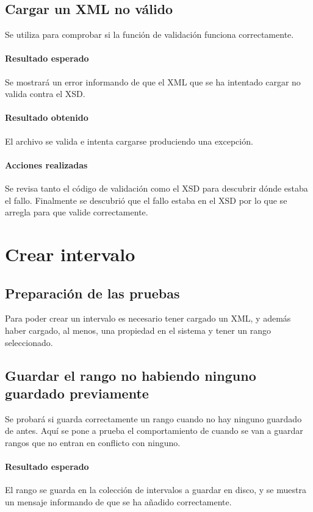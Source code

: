 \subsection{Cargar un XML no v\'alido}
Se utiliza para comprobar si la funci\'on de validaci\'on funciona correctamente.

\paragraph{Resultado esperado}
Se mostrar\'a un error informando de que el XML que se ha intentado cargar
no valida contra el XSD.

\paragraph{Resultado obtenido}
El archivo se valida e intenta cargarse produciendo una
excepci\'on.

\paragraph{Acciones realizadas}
Se revisa tanto el c\'odigo de validaci\'on como el XSD para descubrir
d\'onde estaba el fallo. Finalmente se descubri\'o que el fallo estaba en el
XSD por lo que se arregla para que valide correctamente.

\section{Crear intervalo}
\subsection{Preparaci\'on de las pruebas}
Para poder crear un intervalo es necesario tener cargado un XML, y adem\'as haber cargado,
al menos, una propiedad en el sistema y tener un rango seleccionado.

\subsection{Guardar el rango no habiendo ninguno guardado previamente}
Se probar\'a si guarda correctamente un rango cuando no hay ninguno guardado de antes.
Aqu\'i se pone a prueba el comportamiento de cuando se van a guardar rangos que no entran
en conflicto con ninguno.

\paragraph{Resultado esperado}
El rango se guarda en la colecci\'on de intervalos a guardar en disco, y se 
muestra un mensaje informando de que se ha a\~nadido correctamente.

